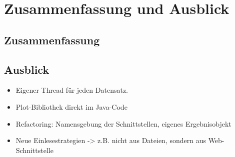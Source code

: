 \chapter{Zusammenfassung und Ausblick}\label{ch:zusammenfassung-und-ausblick}


\section{Zusammenfassung}\label{sec:zusammenfassung}

\section{Ausblick}\label{sec:ausblick}
\begin{itemize}
    \item Eigener Thread für jeden Datensatz.
    \item Plot-Bibliothek direkt im Java-Code
    \item Refactoring: Namensgebung der Schnittstellen, eigenes Ergebnisobjekt
    \item Neue Einlesestrategien -> z.B. nicht aus Dateien, sondern aus Web-Schnittstelle
\end{itemize}